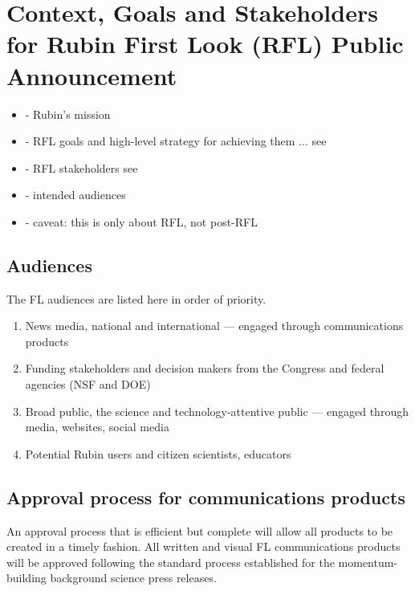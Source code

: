 \section{Context, Goals and Stakeholders for Rubin First Look (RFL) Public Announcement} \label{sec:context}

\begin{itemize}
\item - Rubin’s mission
\item - RFL goals and high-level strategy for achieving them ... see 
\item - RFL stakeholders see 
\item - intended audiences
\item - caveat: this is only about RFL, not post-RFL
\end{itemize}


\subsection{Audiences}
The FL audiences are listed here in order of priority.

\begin{enumerate}
\item News media, national and international — engaged through communications products
\item Funding stakeholders and decision makers from the Congress and federal agencies (NSF and DOE)
\item Broad public, the science and technology-attentive public — engaged through media, websites, social media
\item Potential Rubin users and citizen scientists, educators
\end{enumerate}


\subsection{Approval process for communications products}
An approval process that is efficient but complete will allow all products to be created in a timely fashion. All written and visual FL communications products will be approved following the standard process established for the momentum-building background science press releases.

